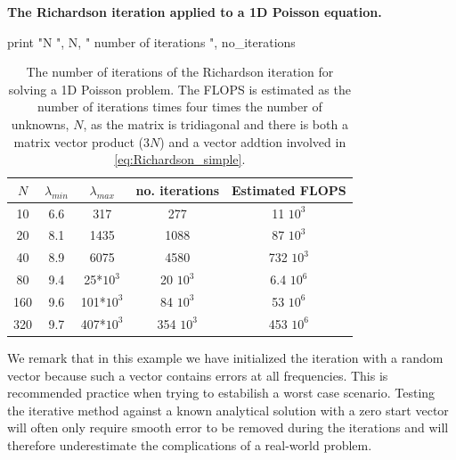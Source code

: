 \begin{example}{\textbf{The Richardson iteration applied to a  1D Poisson equation.}}
\begin{python}
  print "N ", N, " number of iterations ", no_iterations
 
\end{python}

\begin{table}[h]
\begin{center}
\begin{tabular}{|c|c|c|c|c|}  \hline
$N $ & $\lambda_{min}$ & $\lambda_{max}$& no. iterations & Estimated FLOPS \\ \hline
10 & 6.6  & 317   & 277 &  11 $10^3$      \\ \hline
20  & 8.1 & 1435  & 1088 & 87 $10^3$     \\ \hline
40  & 8.9 & 6075  &  4580 & 732  $10^3$   \\ \hline
80 & 9.4  & 25*$10^3$ & 20 $10^3$ & 6.4 $10^6$ \\ \hline 
160 & 9.6 & 101*$10^3$ & 84 $10^3$ & 53 $10^6$   \\ \hline  
320 & 9.7 & 407*$10^3$ & 354 $10^3$ & 453 $10^6$ \\ \hline 
\end{tabular}
\caption{The number of iterations of the Richardson iteration for 
solving a 1D Poisson problem. The FLOPS is estimated 
as the number of iterations times four times the number of unknowns, $N$, 
as the matrix is tridiagonal and there is both a matrix vector product (3$N$)
and a vector addtion involved in \eqref{eq:Richardson_simple}. }
\label{norms}
\end{center}
\end{table}
We remark that in this example we have initialized the iteration with a random vector because
such a vector contains errors at all frequencies. This is recommended practice when 
trying to estabilish a worst case scenario. Testing the iterative method against a known analytical solution with 
a zero start vector will often only require smooth error to be removed during the iterations and will
therefore underestimate the complications of a real-world problem.   
\end{example}



